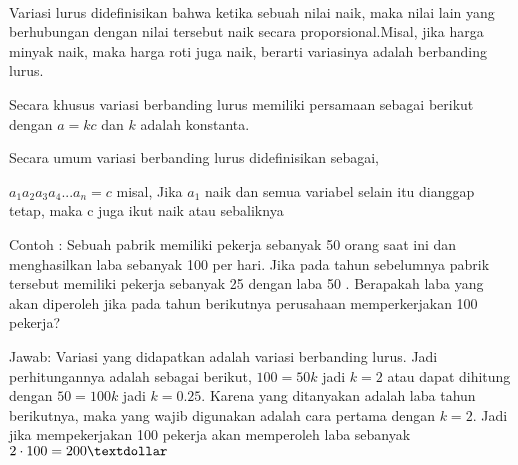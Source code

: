 \paragraph{}
	Variasi lurus didefinisikan bahwa ketika sebuah nilai naik, maka nilai lain yang berhubungan dengan nilai tersebut naik secara proporsional.Misal, jika harga minyak naik, maka harga roti juga naik, berarti variasinya adalah berbanding lurus.
	\par
	Secara khusus variasi berbanding lurus memiliki persamaan sebagai berikut dengan $a=kc$ dan $k$ adalah konstanta. 
	\begin{center}
		
	\end{center}
	Secara umum variasi berbanding lurus didefinisikan sebagai,
	\begin{center}
		$a_1a_2a_3a_4...a_n=c$ misal, Jika $a_1$ naik dan semua variabel selain itu dianggap tetap, maka c juga ikut naik atau sebaliknya
	\end{center}
	Contoh : Sebuah pabrik memiliki pekerja sebanyak 50 orang saat ini dan menghasilkan laba sebanyak 100 \textdollar per hari. Jika pada tahun sebelumnya pabrik tersebut memiliki pekerja sebanyak 25 dengan laba 50 \textdollar. Berapakah laba yang akan diperoleh jika pada tahun berikutnya perusahaan memperkerjakan 100 pekerja?
	\par
	Jawab: Variasi yang didapatkan adalah variasi berbanding lurus. Jadi perhitungannya adalah sebagai berikut, $100=50k$ jadi $k=2$ atau dapat dihitung dengan $50=100k$ jadi $k=0.25$. Karena yang ditanyakan adalah laba tahun berikutnya, maka yang wajib digunakan adalah cara pertama dengan $k=2$. Jadi jika mempekerjakan 100 pekerja akan memperoleh laba sebanyak $2\cdot 100=200 \textdollar$
	
	